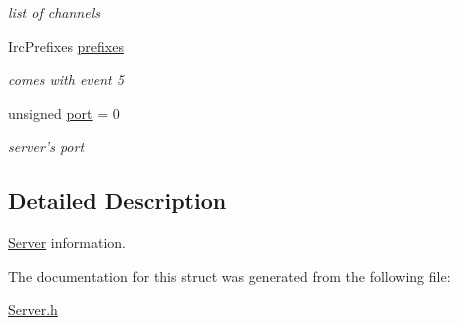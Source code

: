 \begin{DoxyCompactItemize}
\begin{DoxyCompactList}\small\item\em list of channels \end{DoxyCompactList}\item 
\hypertarget{a00031_a2f9786c0579361df0fb3f3dd3bd80970}{Irc\-Prefixes \hyperlink{a00031_a2f9786c0579361df0fb3f3dd3bd80970}{prefixes}}\label{a00031_a2f9786c0579361df0fb3f3dd3bd80970}

\begin{DoxyCompactList}\small\item\em comes with event 5 \end{DoxyCompactList}\item 
\hypertarget{a00031_a6d4036bc9e78cef97f079c29d69b1d5c}{unsigned \hyperlink{a00031_a6d4036bc9e78cef97f079c29d69b1d5c}{port} = 0}\label{a00031_a6d4036bc9e78cef97f079c29d69b1d5c}

\begin{DoxyCompactList}\small\item\em server's port \end{DoxyCompactList}\end{DoxyCompactItemize}


\subsection{Detailed Description}
\hyperlink{a00055}{Server} information. 

The documentation for this struct was generated from the following file\-:\begin{DoxyCompactItemize}
\item 
\hyperlink{a00125}{Server.\-h}\end{DoxyCompactItemize}
